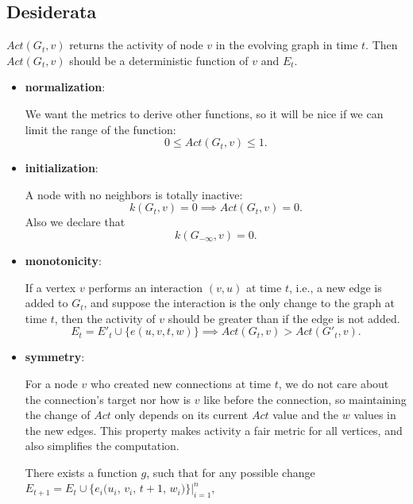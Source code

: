 \documentclass[12pt,abstract=true]{scrartcl}
\numberwithin{equation}{section}
\theoremstyle{definition}   \newtheorem{definition}{Definition}[section]
\theoremstyle{plain}        \newtheorem{theorem}{Theorem}[section]
\theoremstyle{plain}        \newtheorem{observation}{Observation}[section]
\theoremstyle{plain}        \newtheorem{fact}{Fact}[section]
\theoremstyle{plain}        \newtheorem{claim}{Claim}[section]
\theoremstyle{plain}        \newtheorem{lemma}[theorem]{Lemma}
\theoremstyle{plain}        \newtheorem{corollary}[theorem]{Corollary}
\theoremstyle{remark}       \newtheorem{example}{Example}[section]
\theoremstyle{remark}       \newtheorem{remark}{Remark}[section]
\begin{document}
\subsection{Desiderata}
 $\mathit{Act}(G_t,v)$ returns the activity of node $v$ in the evolving graph in
time $t$. Then $\mathit{Act}(G_t,v)$ should be a deterministic function of $v$ and
$E_t$.
\begin{itemize}
\item \textbf{normalization}:

We want the metrics to derive other functions, so it will be nice if we can
limit the range of the function:
\begin{equation}
0\leq \mathit{Act}(G_t,v) \leq 1.
\end{equation}

\item \textbf{initialization}:

A node with no neighbors is totally inactive:
\begin{equation}
k(G_t,v)=0\implies \mathit{Act}(G_t,v)=0.
\end{equation}
Also we declare that
\begin{equation}
k(G_{-\infty},v)=0.
\end{equation}

\item \textbf{monotonicity}:

If a vertex $v$ performs an interaction $(v,u)$ at time $t$, i.e., a new edge
is added to $G_t$, and suppose the interaction is the only change to the graph
at time $t$, then the activity of $v$ should be greater than if the edge is not
added.
\begin{equation}
E_t=E'_t\cup\{e(u,v,t,w)\}\implies \mathit{Act}(G_{t},v)>\mathit{Act}(G'_{t},v
).\label{eq-mono}
\end{equation}

\item \textbf{symmetry}:

For a node $v$ who created new connections at time $t$, we do not care about
the connection's target nor how is $v$ like before the connection, so
maintaining the change of $\mathit{Act}$ only depends on its current
$\mathit{Act}$ value and the $w$ values in the new edges. This property makes
activity a fair metric for all vertices, and also simplifies the computation.

There exists a function $g$, such that for any possible change
$E_{t+1}=E_t\cup\{e_i(u_i$, $v_i$, $t+1$, $w_i)\}|_{i=1}^n$,


\end{itemize}
\end{document}
